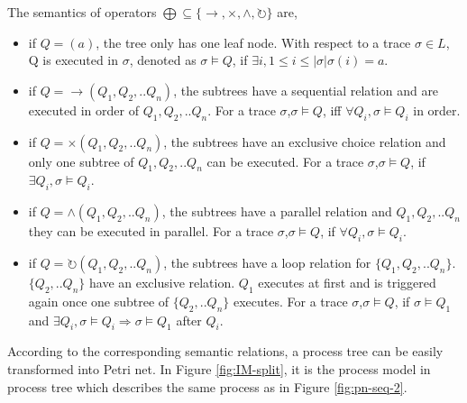 \begin{definition} 
	The semantics of operators $\bigoplus \subseteq \{\rightarrow, \times, \land, \circlearrowright \}$ are,
	\begin{itemize}
		\item if $Q=(a)$, the tree only has one leaf node. With respect to a trace $\sigma \in L$, Q is executed in $\sigma$, denoted as $\sigma \models Q$, if $\exists i, 1 \leq i \leq |\sigma| \sigma(i)=a$.
		\item if $Q= \rightarrow(Q_1 , Q_2 ,.. Q_n)$, the subtrees have a sequential relation and are executed in order of $Q_1,Q_2,..Q_n$. For a trace $\sigma$,$\sigma \models Q$, iff $\forall Q_i, \sigma \models Q_i$ in order.
		\item if $Q= \times(Q_1 , Q_2 ,.. Q_n)$,  the subtrees have an exclusive choice relation and only one subtree of $Q_1,Q_2,..Q_n$  can be executed. 
		For a trace $\sigma$,$\sigma \models Q$, if $\exists Q_i, \sigma \models Q_i$.
		\item if $Q= \land (Q_1 , Q_2 ,.. Q_n)$,  the subtrees have a parallel relation and $Q_1,Q_2,..Q_n$ they can be executed in parallel. For a trace $\sigma$,$\sigma \models Q$, if $\forall Q_i, \sigma \models Q_i$.
		\item if $Q= \circlearrowright(Q_1 , Q_2 ,.. Q_n)$,  the subtrees have a loop relation for $\{Q_1,Q_2,..Q_n\}$. $\{Q_2,..Q_n\}$ have an exclusive relation. $Q_1$ executes at first and is triggered again once one subtree of $\{Q_2,..Q_n\}$ executes. For a trace $\sigma$,$\sigma \models Q$, if $ \sigma \models Q_1$ and $\exists Q_i, \sigma \models Q_i \Rightarrow  \sigma \models Q_1$ after $Q_i$.
	\end{itemize}
\end{definition}
According to the corresponding semantic relations,  a process tree can be easily transformed into Petri net. In Figure \ref{fig:IM-split}, it is the process model in process tree which describes the same process as in Figure \ref{fig:pn-seq-2}. 

